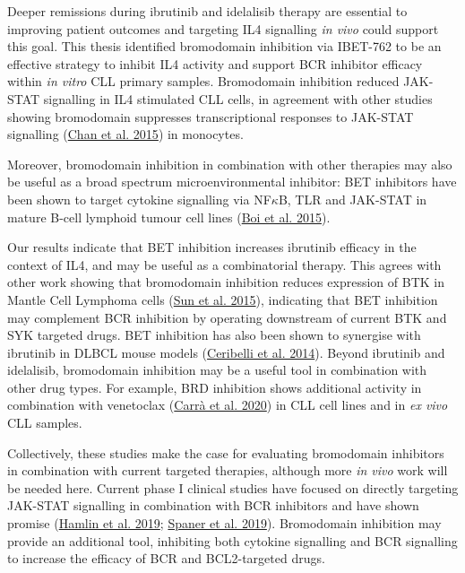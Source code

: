 \documentclass[11pt, a4paper, twosided]{book}
\begin{document}
Deeper remissions during ibrutinib and idelalisib therapy are essential to improving patient outcomes and targeting IL4 signalling \emph{in vivo} could support this goal. This thesis identified bromodomain inhibition via IBET-762 to be an effective strategy to inhibit IL4 activity and support BCR inhibitor efficacy within \emph{in vitro} CLL primary samples. Bromodomain inhibition reduced JAK-STAT signalling in IL4 stimulated CLL cells, in agreement with other studies showing bromodomain suppresses transcriptional responses to JAK-STAT signalling (\protect\hyperlink{ref-Chan2015}{Chan et al. 2015}) in monocytes.

Moreover, bromodomain inhibition in combination with other therapies may also be useful as a broad spectrum microenvironmental inhibitor: BET inhibitors have been shown to target cytokine signalling via NF\(\kappa\)B, TLR and JAK-STAT in mature B-cell lymphoid tumour cell lines (\protect\hyperlink{ref-Boi2015}{Boi et al. 2015}).

Our results indicate that BET inhibition increases ibrutinib efficacy in the context of IL4, and may be useful as a combinatorial therapy. This agrees with other work showing that bromodomain inhibition reduces expression of BTK in Mantle Cell Lymphoma cells (\protect\hyperlink{ref-Sun2015}{Sun et al. 2015}), indicating that BET inhibition may complement BCR inhibition by operating downstream of current BTK and SYK targeted drugs. BET inhibition has also been shown to synergise with ibrutinib in DLBCL mouse models (\protect\hyperlink{ref-Ceribelli2014}{Ceribelli et al. 2014}). Beyond ibrutinib and idelalisib, bromodomain inhibition may be a useful tool in combination with other drug types. For example, BRD inhibition shows additional activity in combination with venetoclax (\protect\hyperlink{ref-Carra2019}{Carrà et al. 2020}) in CLL cell lines and in \emph{ex vivo} CLL samples.

Collectively, these studies make the case for evaluating bromodomain inhibitors in combination with current targeted therapies, although more \emph{in vivo} work will be needed here. Current phase I clinical studies have focused on directly targeting JAK-STAT signalling in combination with BCR inhibitors and have shown promise (\protect\hyperlink{ref-Hamlin2019}{Hamlin et al. 2019}; \protect\hyperlink{ref-Spaner2019}{Spaner et al. 2019}). Bromodomain inhibition may provide an additional tool, inhibiting both cytokine signalling and BCR signalling to increase the efficacy of BCR and BCL2-targeted drugs.
\end{document}
